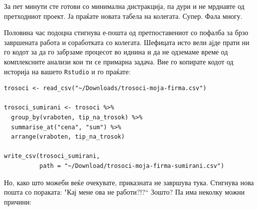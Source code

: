 \documentclass[
]{book}
\newenvironment{Shaded}{\begin{snugshade}}{\end{snugshade}}
\newcommand{\DataTypeTok}[1]{\textcolor[rgb]{0.13,0.29,0.53}{#1}}
\newcommand{\KeywordTok}[1]{\textcolor[rgb]{0.13,0.29,0.53}{\textbf{#1}}}
\newcommand{\NormalTok}[1]{#1}
\newcommand{\OperatorTok}[1]{\textcolor[rgb]{0.81,0.36,0.00}{\textbf{#1}}}
\newcommand{\StringTok}[1]{\textcolor[rgb]{0.31,0.60,0.02}{#1}}
\begin{document}
\begin{Shaded}
\end{Shaded}

За пет минути сте готови со минимална дистракција, па дури и не мрднавте од претходниот проект. Ја праќате новата табела на колегата. Супер. Фала многу.

Половина час подоцна стигнува е-пошта од претпоставениот со пофалба за брзо завршената работа и соработката со колегата. Шефицата исто вели ајде прати ни го кодот за да го забрзаме процесот во иднина и да не одземаме време од комплексните анализи кои ти се примарна задача. Вие го копирате кодот од историја на вашето \texttt{Rstudio} и го праќате:

\begin{verbatim}
trosoci <- read_csv("~/Downloads/trosoci-moja-firma.csv")

trosoci_sumirani <- trosoci %>% 
  group_by(vraboten, tip_na_trosok) %>% 
  summarise_at("cena", "sum") %>% 
  arrange(vraboten, tip_na_trosok)

write_csv(trosoci_sumirani, 
          path = "~/Download/trosoci-moja-firma-sumirani.csv")
\end{verbatim}

Но, како што можеби веќе очекувате, приказната не завршува тука. Стигнува нова пошта со пораката: "Кај мене ова не работи?!?{}`` Зошто? Па има неколку можни причини:
\end{document}
